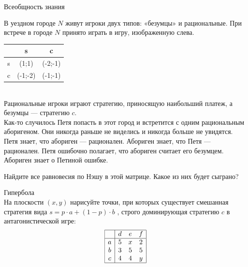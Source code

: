 \begin{problem}
 Всеобщность знания

В уездном городе  $N$  живут игроки двух типов: «безумцы» и рациональные. При встрече в городе  $N$  принято играть в игру, изображенную слева.\\
\begin{tabular}{|c|c|c|}
			\hline
			& s & c \\
			\hline
			s & (1;1) & (-2;-1) \\
			c & (-1;-2) & (-1;-1) \\
			\hline
\end{tabular} \\
Рациональные игроки играют стратегию, приносящую наибольший платеж, а безумцы — стратегию  $c$.\\
Как-то случилось Петя попасть в этот город и встретится с одним рациональным аборигеном. Они никогда раньше не виделись и никогда больше не увидятся. Петя знает, что абориген — рационален. Абориген знает, что Петя — рационален. Петя ошибочно полагает, что абориген считает его безумцем. Абориген знает о Петиной ошибке.

Найдите все равновесия по Нэшу в этой матрице. Какое из них будет сыграно?



\begin{sol}

\end{sol}
\end{problem}



\begin{problem}
 Гипербола\\
На плоскости  $\left(x,y\right)$  нарисуйте точки, при которых существует смешанная стратегия вида  $s=p\cdot a+\left(1-p\right)\cdot b$ , строго доминирующая стратегию  $c$  в антагонистической игре:
\[\begin{array}{|c|ccc|}  \hline {} & {d} & {e} & {f} \\  \hline {a} & {5} & {x} & {2} \\ {b} & {3} & {5} & {5} \\ {c} & {4} & {4} & {y} \\  \hline  \end{array}\]




\begin{sol}

\end{sol}
\end{problem}

